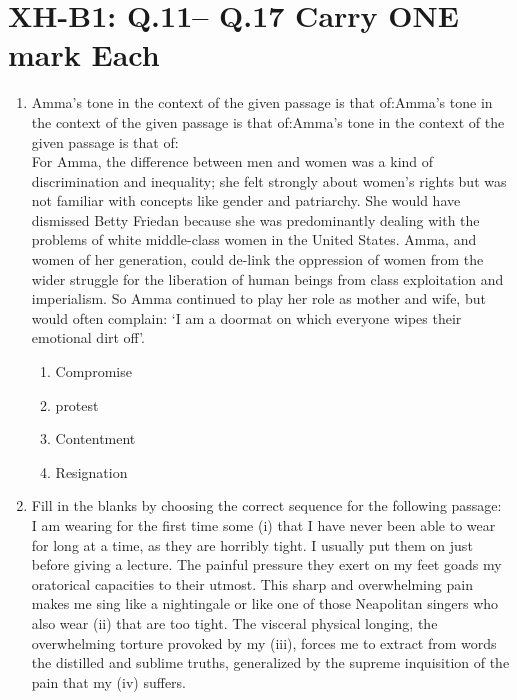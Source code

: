 \documentclass{article}
\begin{document}
\section*{XH-B1: Q.11– Q.17 Carry ONE mark Each}
\begin{enumerate}[leftmargin=*, start=11, label=Q.\arabic*.]
    \item Amma’s tone in the context of the given passage is that of:Amma’s tone in the context of the given passage is that of:Amma’s tone in the context of the given passage is that of: \\ For Amma, the difference between men and women was a kind of discrimination and inequality; she felt strongly about women’s rights but was not familiar with concepts like gender and patriarchy. She would have dismissed Betty Friedan because she was predominantly dealing with the problems of white middle-class women in the United States. Amma, and women of her generation, could de-link the oppression of women from the wider struggle for the liberation of human beings from class exploitation and imperialism. So Amma continued to play her role as mother and wife, but would often complain: ‘I am a doormat on which everyone wipes their emotional dirt off’.
    
    \begin{multicols}{4}
        \begin{enumerate}
            \item Compromise
            \item protest
            \item Contentment
            \item Resignation
        \end{enumerate}
    \end{multicols}

    \item Fill in the blanks by choosing the correct sequence for the following passage: \\ I am wearing for the first time some (i)\makebox[1.5cm]{\hrulefill}
    that I have never been able to wear for long at a time, as they are horribly tight. I usually put them on just before giving a lecture. The painful pressure they exert on my feet goads my oratorical capacities to their utmost. This sharp and overwhelming pain makes me sing like a nightingale or like one of those Neapolitan singers who also wear (ii)\makebox[1.5cm]{\hrulefill} that are too tight. The visceral physical longing, the overwhelming torture provoked by my (iii)\makebox[1.5cm]{\hrulefill}, forces me to extract from words the distilled and sublime truths, generalized by the supreme inquisition of the pain that my (iv)\makebox[1.5cm]{\hrulefill} suffers.
    

\end{enumerate}
\end{document}
